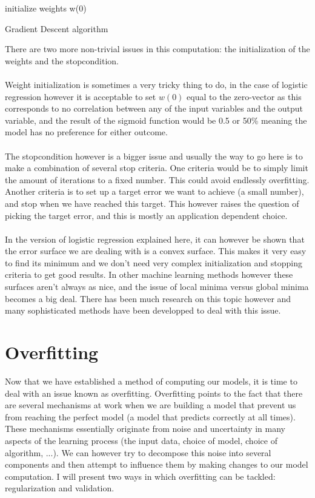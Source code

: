 \begin{algorithm}[H]
	initialize weights w(0) \\
\caption{Gradient Descent algorithm}
\end{algorithm}
There are two more non-trivial issues in this computation: the initialization of the weights and the stopcondition. \\ \\
Weight initialization is sometimes a very tricky thing to do, in the case of logistic regression however it is acceptable to set $w(0)$ equal to the zero-vector as this corresponds to no correlation between any of the input variables and the output variable, and the result of the sigmoid function would be 0.5 or 50\% meaning the model has no preference for either outcome.\\ \\
The stopcondition however is a bigger issue and usually the way to go here is to make a combination of several stop criteria. One criteria would be to simply limit the amount of iterations to a fixed number. This could avoid endlessly overfitting. Another criteria is to set up a target error we want to achieve (a small number), and stop when we have reached this target. This however raises the question of picking the target error, and this is mostly an application dependent choice. \\ \\
In the version of logistic regression explained here, it can however be shown that the error surface we are dealing with is a convex surface\cite{convexerrorlogistic}. This makes it very easy to find its minimum and we don't need very complex initialization and stopping criteria to get good results. In other machine learning methods however these surfaces aren't always as nice, and the issue of local minima versus global minima becomes a big deal. There has been much research on this topic however and many sophisticated methods have been developped to deal with this issue.

\section{Overfitting}
\label{sec:glm-overfitting}
Now that we have established a method of computing our models, it is time to deal with an issue known as overfitting\cite{caltechmachinelearning}\cite{babyak2004you}. Overfitting points to the fact that there are several mechanisms at work when we are building a model that prevent us from reaching the perfect model (a model that predicts correctly at all times). These mechanisms essentially originate from noise and uncertainty in many aspects of the learning process (the input data, choice of model, choice of algorithm, ...). We can however try to decompose this noise into several components and then attempt to influence them by making changes to our model computation. I will present two ways in which overfitting can be tackled: regularization and validation.

